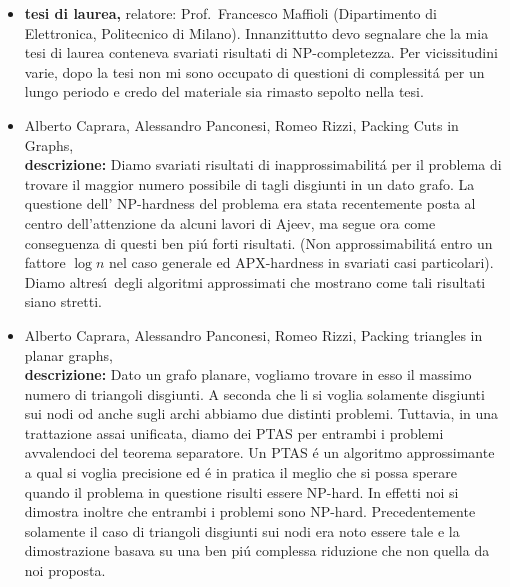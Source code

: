 \documentclass[10pt]{article}
\begin{document}
\begin{itemize}
\vspace{1.4mm}
  \item[] {\bf tesi di laurea,}
          relatore: {\sc Prof.~Francesco Maffioli}
          (Dipartimento di Elettronica, Politecnico di Milano).
          Innanzittutto devo segnalare che la
          mia tesi di laurea conteneva svariati risultati di NP-completezza.
          Per vicissitudini varie,
          dopo la tesi non mi sono occupato di questioni
          di complessit\'a per un lungo periodo
          e credo del materiale sia rimasto sepolto nella tesi.\\

  \vspace{1.4mm}
  \item[] {\sc Alberto Caprara, Alessandro Panconesi, Romeo Rizzi},
   \newblock  Packing Cuts in Graphs,
   \\
{\bf descrizione:}
Diamo svariati risultati di inapprossimabilit\'a
per il problema di trovare il maggior numero possibile di
tagli disgiunti in un dato grafo.
La questione dell' NP-hardness del problema
era stata recentemente posta al centro dell'attenzione
da alcuni lavori di Ajeev,
ma segue ora come conseguenza di questi ben pi\'u forti risultati.
(Non approssimabilit\'a entro un fattore $\log n$ nel caso generale
ed APX-hardness in svariati casi particolari).
Diamo altres\'\i\ degli algoritmi approssimati che mostrano
come tali risultati siano stretti.\\

  \vspace{1.4mm}
  \item[] {\sc Alberto Caprara, Alessandro Panconesi, Romeo Rizzi},
   \newblock  Packing triangles in planar graphs,
   \\
{\bf descrizione:}
Dato un grafo planare,
vogliamo trovare in esso il massimo numero di triangoli disgiunti.
A seconda che li si voglia solamente disgiunti sui nodi od
anche sugli archi abbiamo due distinti problemi.
Tuttavia, in una trattazione assai unificata,
diamo dei PTAS per entrambi i problemi
avvalendoci del teorema separatore.
Un PTAS \'e un algoritmo approssimante
a qual si voglia precisione
ed \'e in pratica il meglio che si possa sperare
quando il problema in questione
risulti essere NP-hard.
In effetti noi si dimostra inoltre che entrambi i problemi sono
NP-hard.
Precedentemente solamente il caso di triangoli disgiunti
sui nodi era noto essere tale e la dimostrazione
basava su una ben pi\'u complessa riduzione
che non quella da noi proposta.\\
\end{itemize}
\end{document}
